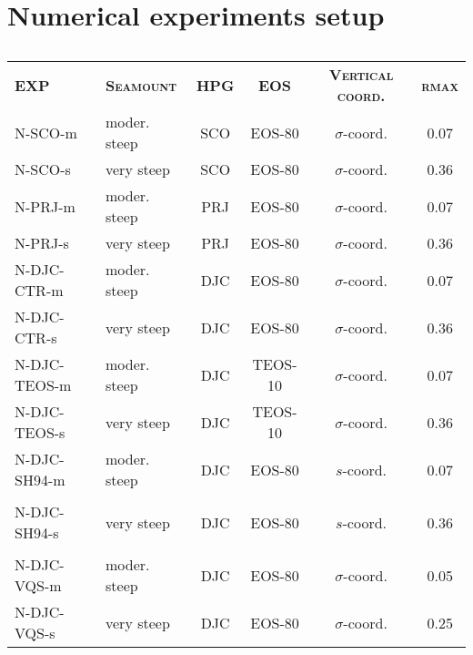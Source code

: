 \documentclass[authoryear]{elsarticle}
\begin{document}
\newpage

\section{Numerical experiments setup} \label{Sec_exp}

\begin{table}[h]
	\centering
	\hspace{-7cm}
	\begin{scriptsize}
		\begin{tabular}{llcccc}
			\cmidrule[0.5pt]{1-6}
			\textsc{\textbf{EXP}} & \textsc{\textbf{Seamount}} & \textsc{\textbf{HPG}} & \textsc{\textbf{EOS}} & \textsc{\textbf{Vertical coord.}} & \textsc{\textbf{rmax}} \\
			\cmidrule[0.5pt]{1-6}
			N-SCO-m      & moder. steep & SCO & EOS-80  & $\sigma$-coord. & 0.07 \\
			N-SCO-s      & very steep       & SCO & EOS-80  & $\sigma$-coord. & 0.36 \\
			N-PRJ-m      & moder. steep & PRJ & EOS-80  & $\sigma$-coord. & 0.07 \\
			N-PRJ-s      & very steep       & PRJ & EOS-80  & $\sigma$-coord. & 0.36 \\
			N-DJC-CTR-m  & moder. steep & DJC & EOS-80  & $\sigma$-coord. & 0.07 \\
			N-DJC-CTR-s  & very steep       & DJC & EOS-80  & $\sigma$-coord. & 0.36 \\
			N-DJC-TEOS-m & moder. steep & DJC & TEOS-10 & $\sigma$-coord. & 0.07 \\
			N-DJC-TEOS-s & very steep       & DJC & TEOS-10 & $\sigma$-coord. & 0.36 \\
			N-DJC-SH94-m & moder. steep & DJC & EOS-80  & $s$-coord.      & 0.07 \\
			             &                  &     &         & \cite{Song1994}  &      \\
			N-DJC-SH94-s & very steep       & DJC & EOS-80  & $s$-coord.      & 0.36 \\
			             &                  &     &         & \cite{Song1994}  &      \\	
			N-DJC-VQS-m  & moder. steep & DJC & EOS-80  & $\sigma$-coord. & 0.05 \\
			N-DJC-VQS-s  & very steep       & DJC & EOS-80  & $\sigma$-coord. & 0.25 \\              
			\cmidrule[.5pt]{1-6}
		\end{tabular}
	\end{scriptsize}
	\hspace{-7cm}
	\caption{ }
\end{table}
\end{document}
